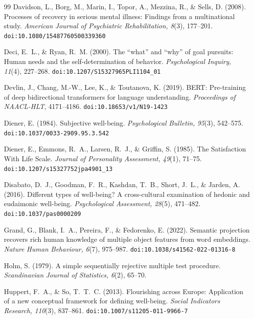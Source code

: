 \documentclass[12pt,a4paper]{article}
\begin{document}
\begin{thebibliography}{99}
Davidson, L., Borg, M., Marin, I., Topor, A., Mezzina, R., \& Sells, D. (2008).
Processes of recovery in serious mental illness: Findings from a multinational study.
\textit{American Journal of Psychiatric Rehabilitation, 8}(3), 177--201.
\texttt{doi:10.1080/15487760500339360}

Deci, E.~L., \& Ryan, R.~M. (2000).
The ``what'' and ``why'' of goal pursuits: Human needs and the self-determination of behavior.
\textit{Psychological Inquiry, 11}(4), 227--268.
\texttt{doi:10.1207/S15327965PLI1104\_01}

Devlin, J., Chang, M.-W., Lee, K., \& Toutanova, K. (2019).
BERT: Pre-training of deep bidirectional transformers for language understanding.
\textit{Proceedings of NAACL-HLT}, 4171--4186.
\texttt{doi:10.18653/v1/N19-1423}

Diener, E. (1984).
Subjective well-being.
\textit{Psychological Bulletin, 95}(3), 542--575.
\texttt{doi:10.1037/0033-2909.95.3.542}

Diener, E., Emmons, R.~A., Larsen, R.~J., \& Griffin, S. (1985).
The Satisfaction With Life Scale.
\textit{Journal of Personality Assessment, 49}(1), 71--75.
\texttt{doi:10.1207/s15327752jpa4901\_13}

Disabato, D.~J., Goodman, F.~R., Kashdan, T.~B., Short, J.~L., \& Jarden, A. (2016).
Different types of well-being? A cross-cultural examination of hedonic and eudaimonic well-being.
\textit{Psychological Assessment, 28}(5), 471--482.
\texttt{doi:10.1037/pas0000209}

Grand, G., Blank, I.~A., Pereira, F., \& Fedorenko, E. (2022).
Semantic projection recovers rich human knowledge of multiple object features from word embeddings.
\textit{Nature Human Behaviour, 6}(7), 975--987.
\texttt{doi:10.1038/s41562-022-01316-8}

Holm, S. (1979).
A simple sequentially rejective multiple test procedure.
\textit{Scandinavian Journal of Statistics, 6}(2), 65--70.

Huppert, F.~A., \& So, T.~T.~C. (2013).
Flourishing across Europe: Application of a new conceptual framework for defining well-being.
\textit{Social Indicators Research, 110}(3), 837--861.
\texttt{doi:10.1007/s11205-011-9966-7}


\end{thebibliography}
\end{document}
